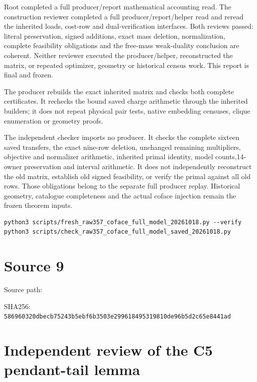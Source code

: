\documentclass[
  10pt,
]{report}
\begin{document}
Root completed a full producer/report mathematical accounting read. The
construction reviewer completed a full producer/report/helper read and
reread the inherited loads, cost-row and dual-verification interfaces.
Both reviews passed: literal preservation, signed additions, exact mass
deletion, normalization, complete feasibility obligations and the
free-mass weak-duality conclusion are coherent. Neither reviewer
executed the producer/helper, reconstructed the matrix, or repeated
optimizer, geometry or historical census work. This report is final and
frozen.

The producer rebuilds the exact inherited matrix and checks both
complete certificates. It rechecks the bound saved charge arithmetic
through the inherited builders; it does not repeat physical pair tests,
native embedding censuses, clique enumeration or geometry proofs.

The independent checker imports no producer. It checks the complete
sixteen saved transfers, the exact nine-row deletion, unchanged
remaining multipliers, objective and normalizer arithmetic, inherited
primal identity, model counts,14-owner preservation and interval
arithmetic. It does not independently reconstruct the old matrix,
establish old signed feasibility, or verify the primal against all old
rows. Those obligations belong to the separate full producer replay.
Historical geometry, catalogue completeness and the actual coface
injection remain the frozen theorem inputs.

\begin{verbatim}
python3 scripts/fresh_raw357_coface_full_model_20261018.py --verify
python3 scripts/check_raw357_coface_full_model_saved_20261018.py
\end{verbatim}

\clearpage

\chapter{Source 9}\label{source-9}

Source path: 

SHA256:
\nolinkurl{586960320dbecb75243b5ebf6b3503e299618495319810de96b5d2c65e8441ad}

\chapter{Independent review of the C5 pendant-tail
lemma}\label{independent-review-of-the-c5-pendant-tail-lemma}
\end{document}
